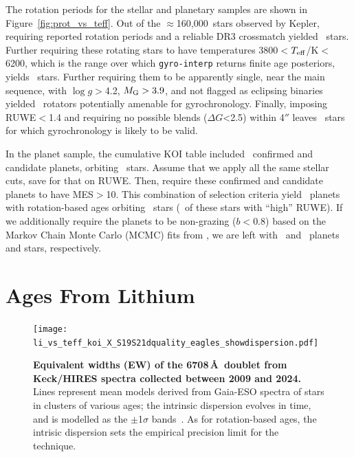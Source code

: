 \documentclass[11pt,twocolumn,tighten]{aastex63}
\newcommand{\nkeplerstars}{$\approx$160{,}000}
\begin{document}
The rotation periods for the stellar and planetary samples are shown
in Figure~\ref{fig:prot_vs_teff}.  Out of the \nkeplerstars\ stars
observed by Kepler, requiring reported rotation periods and a
reliable DR3 crossmatch yielded
\nuniqstarsantosrot\ stars.  Further requiring these rotating stars
to have temperatures 3800$<$$T_{\rm eff}$/K$<$6200, which is the range
over which \texttt{gyro-interp} returns finite age posteriors,
yields \nuniqstarsantosrotteffcut\ stars.
Further requiring them to be apparently single, near the main
sequence, with $\log g$$>$4.2, $M_{\rm G}>3.9$, and not flagged as
eclipsing binaries yielded \nuniqstarsantosallbutruwe\ rotators
potentially amenable for gyrochronology.
Finally, imposing RUWE$<$1.4 and requiring no possible blends ($\Delta
G$<2.5) within 4$''$ leaves \nuniqstarsantosrotgyroappl\ stars for
which gyrochronology is likely to be valid.


In the planet sample, the cumulative KOI table included
\nnonfpcumkois\ confirmed and candidate planets, orbiting
\nnonfpcumkoihosts\ stars.  Assume that we apply all the same stellar
cuts, save for that on RUWE.
Then,
require these confirmed and candidate planets to have MES$>$10.
This combination of selection criteria
yield \nplwgyroagewithgrazingandhighruwe\ planets with rotation-based
ages orbiting \nplhoststarwgyroagewithgrazingandhighruwe\ stars
(\nplhoststarwgyroagejusthighruwe\ of these stars with ``high'' RUWE).
If we additionally require the planets to be non-grazing ($b<0.8$)
based on the Markov Chain Monte Carlo (MCMC) fits from
\citet{Thompson_2018}, we are left with \nplwgyroagenograzing\ and
\nplhoststarwgyroagenograzing\ planets and stars, respectively.




\section{Ages From Lithium}
\label{sec:liage}

\begin{figure}[!t]
	\begin{center}
		\leavevmode
		\texttt{[image: li\_vs\_teff\_koi\_X\_S19S21dquality\_eagles\_showdispersion.pdf]}
	\end{center}
	\vspace{-0.6cm}
	\caption{
    {\bf Equivalent widths (EW) of the  6708\,\AA\ doublet
    from Keck/HIRES spectra collected between 2009 and 2024.}
    Lines represent mean models derived from Gaia-ESO spectra of stars
    in clusters of various ages; the intrinsic dispersion 
    evolves in time, and is modelled as the $\pm$1$\sigma$
    bands~\citep{Jeffries_2023}.
    As for rotation-based ages, the intrisic dispersion sets the
    empirical precision limit for the technique.
		\label{fig:li_vs_teff}
	}
\end{figure}
\end{document}

